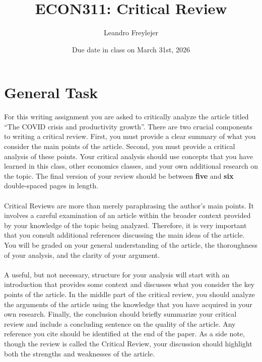 \documentclass[letterpaper,12pt]{article}
\title{ECON311: Critical Review}
\author{Leandro Freylejer}
\date{Due date in class on March 31st, 2026}
\theoremstyle{dotlessS}
\begin{document}
\maketitle
\vspace{-.3in}
\section*{General Task}
For this writing assignment you are asked to critically analyze the article titled ``The COVID crisis and productivity growth''. There are two crucial components to writing a critical review. First, you must provide a clear summary of what you consider the main points of the article. Second, you must provide a critical analysis of these points. Your critical analysis should use concepts that you have learned in this class, other economics classes, and your own additional research on the topic. The final version of your review should be between \textbf{five} and \textbf{six} double-spaced pages in length.  \\
\\
Critical Reviews are more than merely paraphrasing the author's main points. It involves a careful examination of an article within the broader context provided by your knowledge of the topic being analyzed. Therefore, it is very important that you consult additional references discussing the main ideas of the article. You will be graded on your general understanding of the article, the thoroughness of your analysis, and the clarity of your argument.\\
\\
A useful, but not necessary, structure for your analysis will start with an introduction that provides some context and discusses what you consider the key points of the article. In the middle part of the critical review, you should analyze the arguments of the article using the knowledge that you have acquired in your own research. Finally, the conclusion should briefly summarize your critical review and include a concluding sentence on the quality of the article. Any reference you cite should be identified at the end of the paper. As a side note, though the review is called the Critical Review, your discussion should highlight both the strengths and weaknesses of the article.               
\end{document}
